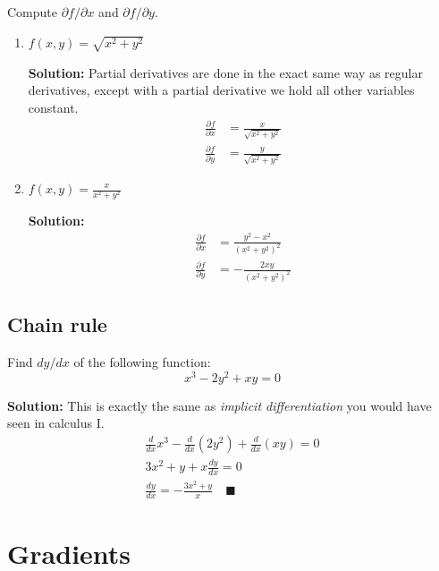 \documentclass[letterpaper, 11pt]{article}
\begin{document}
\subsection{} Compute $\partial f / \partial x$ and $\partial f / \partial y$. 
\begin{enumerate}[label=(\alph*)]
\item $f(x,y) = \sqrt{x^2 + y^2}$
\par \textbf{Solution:} Partial derivatives are done in the exact same way as regular derivatives, except with a partial derivative we hold all other variables constant.
\begin{align*}
\frac{\partial f}{\partial x} &= \frac{x}{\sqrt{x^2 + y^2}} \\
\frac{\partial f}{\partial y} &= \frac{y}{\sqrt{x^2 + y^2}} 
\end{align*}


\item $f(x,y) = \frac{x}{x^2 + y^2}$
\par \textbf{Solution:}
\begin{align*}
\frac{\partial f}{\partial x} &= \frac{y^2 - x^2 }{(x^2 + y^2)^2} \\
\frac{\partial f}{\partial y} &= -\frac{2xy}{(x^2 + y^2)^2} 
\end{align*}


\end{enumerate}

\subsection{Chain rule} Find $dy/dx$ of the following function:
\[ x^3 - 2y^2+ xy=0 \]
\par \textbf{Solution:} This is exactly the same as \textit{implicit differentiation} you would have seen in calculus I. 
\begin{gather*}
\frac{d}{dx} x^3 - \frac{d}{dx} \left(2y^2\right)+ \frac{d}{dx} (xy)=0 \\
3x^2 + y + x\frac{dy}{dx} = 0 \\
\frac{dy}{dx} = -\frac{3x^2 + y}{x} \quad\blacksquare
\end{gather*}


\section{Gradients}
\end{document}
